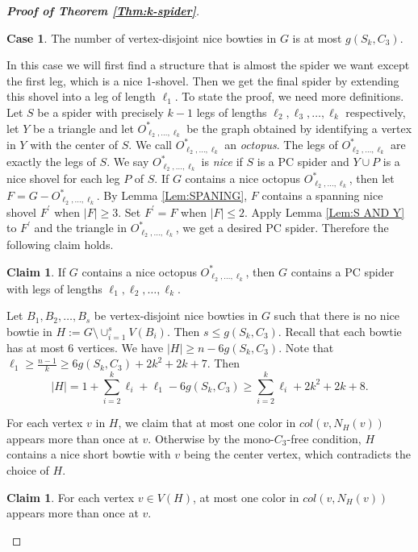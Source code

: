 \documentclass[10pt,a4paper]{article}
\theoremstyle{definition}
\newtheorem{case}{Case}
\newtheorem{claimA}[lemmaA]{Claim}
\begin{document}
\begin{proof}[\textbf{Proof of Theorem \ref{Thm:k-spider}}]
\begin{case}
   The number of vertex-disjoint nice bowties in $G$ is at most $g(S_k,C_3)$.
\end{case}
In this case we will first find a structure that is almost the spider we want except the first leg, which is a nice 1-shovel. Then we get the final spider by extending this shovel into a leg of length $\ell_1$.
To state the proof, we need more definitions.
Let $S$ be a spider with precisely $k-1$ legs of lengths $\ell_2,\ell_3,\ldots,\ell_k$ respectively, let $Y$ be a triangle and let $O^*_{ \ell_2, \ldots, \ell_k}$ be the graph obtained by identifying a vertex in $Y$ with the center of $S$. We call $O^*_{ \ell_2, \ldots, \ell_k}$ an {\it octopus}. The legs of $O^*_{ \ell_2, \ldots, \ell_k}$ are exactly the legs of $S$. We say $O^*_{ \ell_2, \ldots, \ell_k}$ is {\it nice} if $S$ is a PC spider and $Y\cup P$ is a nice shovel for each leg $P$ of $S$. If $G$ contains a {nice} octopus $O^*_{ \ell_2, \ldots, \ell_k}$, then let $F=G-O^*_{ \ell_2, \ldots, \ell_k}$.
By Lemma \ref{Lem:SPANING},  $F$ contains a spanning nice shovel $F^\prime$ when $|F|\geq 3$. Set $F^\prime=F$ when $|F|\leq 2$. Apply Lemma \ref{Lem:S AND Y} to $F^\prime$ and the triangle in $O^*_{ \ell_2, \ldots, \ell_k}$, we get a desired PC spider. Therefore the following claim holds.
\begin{claimA}\label{Cl:octopus}
	If $G$ contains a nice octopus $O^*_{ \ell_2, \ldots, \ell_k}$, then $G$ contains a PC spider with legs of lengths $\ell_1,\ell_2, \ldots, \ell_k$.
\end{claimA}


Let $B_1,B_2,\ldots,B_s$ be vertex-disjoint nice bowties in $G$ such that there is no nice bowtie in $H:=G\setminus \cup_{i=1}^s V(B_i)$. Then $s\leq g(S_k,C_3)$. Recall that each bowtie has at most $6$ vertices. We have $|H|\geq n-6g(S_k,C_3)$. Note that $\ell_1\geq \frac{n-1}{k}\geq 6g(S_k,C_3)+2k^2+2k+7$. Then
$$|H|=1+\sum_{i=2}^k\ell_i+\ell_1-6g(S_k,C_3)\geq \sum_{i=2}^k\ell_i+2k^2+2k+8.$$

For each vertex $v$ in $H$, we claim that at most one color in $col(v,N_{H}(v))$ appears more than once at $v$. Otherwise by the mono-$C_3$-free condition, $H$  contains a nice short bowtie with $v$ being the center vertex, which contradicts the choice of $H$.

\begin{claimA}\label{Cl:color-once}
For each vertex $v\in V(H)$, at most one color in $col(v,N_{H}(v))$ appears more than once at $v$.
\end{claimA}


\end{proof}
\end{document}
